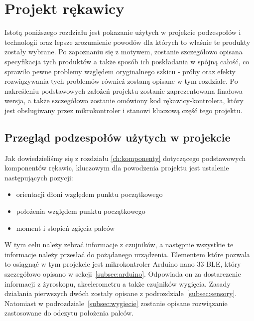 \chapter{Projekt rękawicy}
\label{ch:rekawica}
Istotą poniższego rozdziału jest pokazanie użytych w projekcie podzespołów i technologii oraz lepsze zrozumienie powodów dla których to właśnie te produkty zostały wybrane. Po zapoznaniu się z motywem, zostanie szczegółowo opisana specyfikacja tych produktów a także sposób ich poskładania w spójną całość, co sprawiło pewne problemy względem oryginalnego szkicu - próby oraz efekty rozwiązywania tych problemów również zostaną opisane w tym rozdziale. Po nakreśleniu podstawowych założeń projektu zostanie zaprezentowana finałowa wersja, a także szczegółowo zostanie omówiony kod rękawicy-kontrolera, który jest obsługiwany przez mikrokontroler i stanowi kluczową część tego projektu.

\section{Przegląd podzespołów użytych w projekcie}
\label{sec:przeglad}
Jak dowiedzieliśmy się z rozdziału \ref{ch:komponenty} dotyczącego podstawowych komponentów rękawic, kluczowym dla powodzenia projektu jest ustalenie następujących pozycji: 
\begin{itemize}
\item orientacji dłoni względem punktu początkowego
\item położenia względem punktu początkowego
\item moment i stopień zgięcia palców 
\end{itemize}
 W tym celu należy zebrać informacje z czujników, a następnie wszystkie te informacje należy przesłać do pożądanego urządzenia. Elementem które pozwala to osiągnąć w tym projekcie jest mikrokontroler Arduino nano 33 BLE, który szczegółowo opisano w sekcji~\ref{subsec:arduino}. Odpowiada on za dostarczenie informacji z żyroskopu, akcelerometru a także czujników wygięcia. Zasady działania pierwszych dwóch zostały opisane z podrozdziale~\ref{subsec:sensory}. Natomiast w podrozdziale~\ref{subsec:wygiecie} zostanie opisane rozwiązanie zastosowane do odczytu położenia palców.
	
